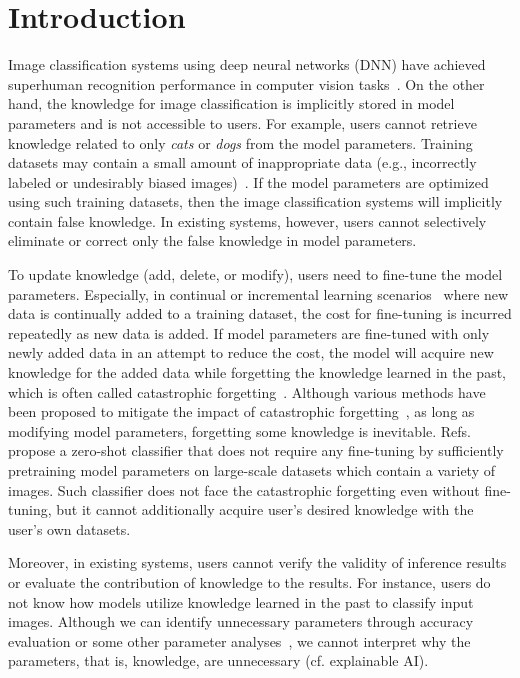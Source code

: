 \documentclass[runningheads]{llncs}
\begin{document}
\section{Introduction}
\label{sec:introduction}

Image classification systems using deep neural networks (DNN) have achieved superhuman recognition performance in computer vision tasks~\cite{LeNet,AlexNet,VGG,ResNet,ViT,CoAtNet}.
On the other hand, the knowledge for image classification is implicitly stored in model parameters and is not accessible to users.
For example, users cannot retrieve knowledge related to only \textit{cats} or \textit{dogs} from the model parameters.
Training datasets may contain a small amount of inappropriate data
(e.g., incorrectly labeled or undesirably biased images)~\cite{ImageNetLabelError,ImageNetReaL,UncoveringBiases}.
If the model parameters are optimized using such training datasets, then the image classification systems will implicitly contain false knowledge.
In existing systems, however, users cannot selectively eliminate or correct only the false knowledge in model parameters.

To update knowledge (add, delete, or modify), users need to fine-tune the model parameters.
Especially, in continual or incremental learning scenarios~\cite{SurveyIncLearn,SurveyOnlineLearn} where new data is continually added to a training dataset,
the cost for fine-tuning is incurred repeatedly as new data is added.
If model parameters are fine-tuned with only newly added data in an attempt to reduce the cost,
the model will acquire new knowledge for the added data while forgetting the knowledge learned in the past,
which is often called catastrophic forgetting~\cite{cataforget,SurveyIncLearn}.
Although various methods have been proposed to mitigate the impact of catastrophic forgetting~\cite{iCaRL,GEM,AGEM,EWC,ER,ERTrick},
as long as modifying model parameters, forgetting some knowledge is inevitable.
Refs.~\cite{CLIP,ALIGN} propose a zero-shot classifier that does not require any fine-tuning 
by sufficiently pretraining model parameters on large-scale datasets which contain a variety of images.
Such classifier does not face the catastrophic forgetting even without fine-tuning, but it cannot additionally acquire user's desired knowledge with the user's own datasets.

Moreover, in existing systems, users cannot verify the validity of inference results or evaluate the contribution of knowledge to the results.
For instance, users do not know how models utilize knowledge learned in the past to classify input images.
Although we can identify unnecessary parameters through accuracy evaluation or some other parameter analyses~\cite{bayesian_pruning,reinforcement_pruning,AdvPrune}, 
we cannot interpret why the parameters, that is, knowledge, are unnecessary (cf. explainable AI).
\end{document}
